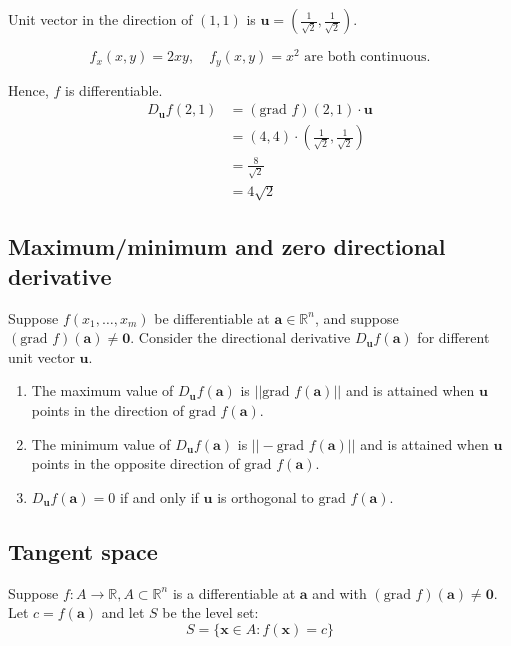 \documentclass[11pt]{article}
\begin{document}
Unit vector in the direction of \((1, 1)\) is \(\boldsymbol{u} = (\frac{1}{\sqrt{2}}, \frac{1}{\sqrt{2}})\).

\[f_x(x, y) = 2xy, \quad f_y(x, y) = x^2 \text{ are both continuous.}\]

Hence, \(f\) is differentiable.
\begin{align*}
D_{\boldsymbol{u}} f(2, 1) &= (\text{grad } f)(2, 1) \cdot \boldsymbol{u} \\
&= (4, 4) \cdot \left(\frac{1}{\sqrt{2}}, \frac{1}{\sqrt{2}} \right) \\
&= \frac{8}{\sqrt{2}} \\
&= 4 \sqrt{2}
\end{align*}

\subsection{Maximum/minimum and zero directional derivative}
\label{sec:org6301cbd}
Suppose \(f(x_1, \ldots, x_m)\) be differentiable at \(\boldsymbol{a} \in \mathbb{R}^n\), and suppose \((\text{grad } f)(\boldsymbol{a}) \ne \boldsymbol{0}\). Consider the directional derivative \(D_{\boldsymbol{u}} f(\boldsymbol{a})\) for different unit vector \(\boldsymbol{u}\).

\begin{enumerate}
\item The maximum value of \(D_{\boldsymbol{u}}f(\boldsymbol{a})\) is \(||\text{grad } f(\boldsymbol{a})||\) and is attained when \(\boldsymbol{u}\) points in the direction of \(\text{grad } f(\boldsymbol{a})\).
\item The minimum value of \(D_{\boldsymbol{u}} f(\boldsymbol{a})\) is \(||- \text{grad } f(\boldsymbol{a})||\) and is attained when \(\boldsymbol{u}\) points in the opposite direction of \(\text{grad } f(\boldsymbol{a})\).
\item \(D_{\boldsymbol{u}}f(\boldsymbol{a}) = 0\) if and only if \(\boldsymbol{u}\) is orthogonal to \(\text{grad } f(\boldsymbol{a})\).
\end{enumerate}

\subsection{Tangent space}
\label{sec:org9b52c45}
Suppose \(f : A \rightarrow \mathbb{R}, A \subset \mathbb{R}^n\) is a differentiable at \(\boldsymbol{a}\) and with \((\text{grad } f)(\boldsymbol{a}) \ne \boldsymbol{0}\). Let \(c = f(\boldsymbol{a})\) and let \(S\) be the level set:
\[S = \{\boldsymbol{x} \in A : f(\boldsymbol{x}) = c\}\]
\end{document}
